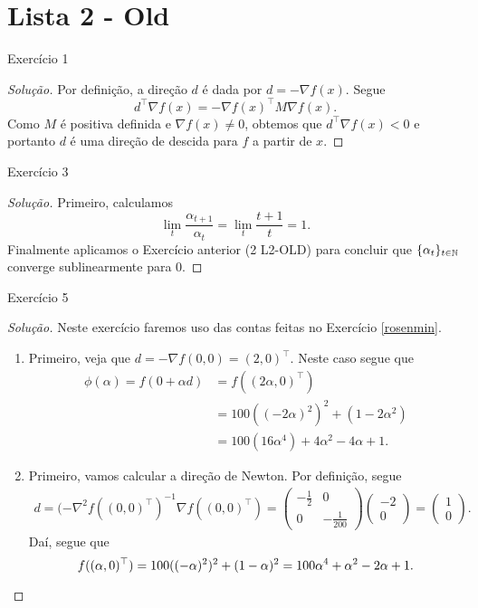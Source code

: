 \documentclass[12pt,twoside,a4paper]{article}
\begin{document}
\section{Lista 2 - Old}
\begin{problema}
 Exercício 1
\end{problema}
\begin{proof}[Solução]
  Por definição, a direção \(d\) é dada por \(d=-\nabla f(x)\). Segue
  \[d^\top\nabla f(x)=-\nabla f(x)^\top M\nabla f(x).\]
  Como \(M\) é positiva definida e \(\nabla f(x)\not =0\), obtemos que
  \(d^\top\nabla f(x)<0\) e portanto \(d\) é uma direção de descida para \(f\)
  a partir de \(x\).
\end{proof}
\begin{problema}
Exercício 3
\end{problema}
\begin{proof}[Solução]
  Primeiro, calculamos
  \[\lim_{t}\frac{\alpha_{t+1}}{\alpha_t}=\lim_{t}\frac{t+1}{t} =1.\]
  Finalmente aplicamos o Exercício anterior (2 L2-OLD) para concluir que
  \(\{\alpha_t\}_{t\in\mathbb{N}}\) converge sublinearmente para \(0\).
\end{proof}
\begin{problema}
Exercício 5  
\end{problema}
\begin{proof}[Solução]
  Neste exercício faremos uso das contas feitas no
  Exercício \ref{rosenmin}.
  \begin{enumerate}
  \item Primeiro, veja que \(d=-\nabla f(0,0)=(2,0)^\top\). Neste caso
    segue que
    \begin{align*}
      \phi(\alpha)=f(0+\alpha d)&=f((2\alpha,0)^\top)\\&=
      100((-2\alpha)^2)^2+(1-2\alpha^2)\\&=
      100(16\alpha^4)+4\alpha^2-4\alpha + 1.
    \end{align*}
  \item Primeiro, vamos calcular a direção de Newton. Por definição, segue
    \begin{align*}
      d= (-\nabla^2f((0,0)^\top)^{-1}\nabla f((0,0)^\top)=\begin{pmatrix}
        -\frac{1}{2} & 0 \\ 0 & -\frac{1}{200}\end{pmatrix}\begin{pmatrix}
        -2 \\ 0 
      \end{pmatrix}=\begin{pmatrix}1 \\ 0\end{pmatrix}.
    \end{align*}
    Daí, segue que
    \[f((\alpha,0)^\top)=100((-\alpha)^2)^2+(1-\alpha)^2= 100\alpha^4+\alpha^2-2\alpha+1.\qedhere\]
  \end{enumerate}
\end{proof}
\end{document}
